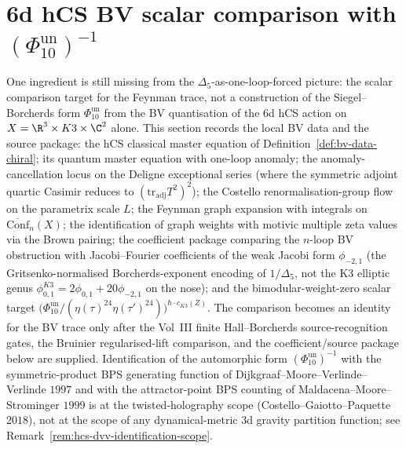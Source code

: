 
\section{6d hCS BV scalar comparison with $(\Phi_{10}^{\mathrm{un}})^{-1}$}
\label{sec:pf-hcs-bv-feynman-trace}

\providecommand{\hCS}{\mathrm{hCS}}
\providecommand{\Conf}{\mathrm{Conf}}
\providecommand{\EndC}{\mathcal{E}}

One ingredient is still missing from the $\Delta_5$-as-one-loop-forced
picture: the scalar comparison target for the Feynman trace, not a
construction of the Siegel--Borcherds form $\Phi_{10}^{\mathrm{un}}$
from the BV quantisation of the 6d hCS action on
$X = \R^3\times K3\times\C^2$ alone. This section records the local
BV data and the source package: the $\hCS$ classical master equation of
Definition~\ref{def:bv-data-chiral}; its quantum master equation with
one-loop anomaly; the anomaly-cancellation locus on the Deligne
exceptional series (where the symmetric adjoint quartic Casimir
reduces to $(\mathrm{tr}_{\mathrm{adj}}T^2)^2$); the Costello
renormalisation-group flow on the parametrix scale $L$; the Feynman
graph expansion with integrals on $\overline{\Conf}_n(X)$; the
identification of graph weights with motivic multiple zeta values via
the Brown pairing; the coefficient package comparing the $n$-loop BV
obstruction with Jacobi--Fourier coefficients of the weak Jacobi form
$\phi_{-2,1}$ (the Gritsenko-normalised Borcherds-exponent encoding of
$1/\Delta_5$, not the K3 elliptic genus
$\phi_{0,1}^{K3} = 2\phi_{0,1} + 20\phi_{-2,1}$ on the nose); and the
bimodular-weight-zero scalar target
$\bigl(\Phi_{10}^{\mathrm{un}}/(\eta(\tau)^{24}\eta(\tau')^{24})\bigr)^{\hbar\cdot
c_{K3}(Z)}$. The comparison becomes an identity for the BV trace only
after the Vol~III finite Hall--Borcherds source-recognition gates, the
Bruinier regularised-lift comparison, and the coefficient/source
package below are supplied. Identification of the automorphic form
$(\Phi_{10}^{\mathrm{un}})^{-1}$ with the symmetric-product BPS
generating function of Dijkgraaf--Moore--Verlinde--Verlinde $1997$
and with the attractor-point BPS counting of
Maldacena--Moore--Strominger $1999$ is at the twisted-holography
scope (Costello--Gaiotto--Paquette $2018$), not at the scope of any
dynamical-metric $3$d gravity partition function; see
Remark~\ref{rem:hcs-dvv-identification-scope}.


